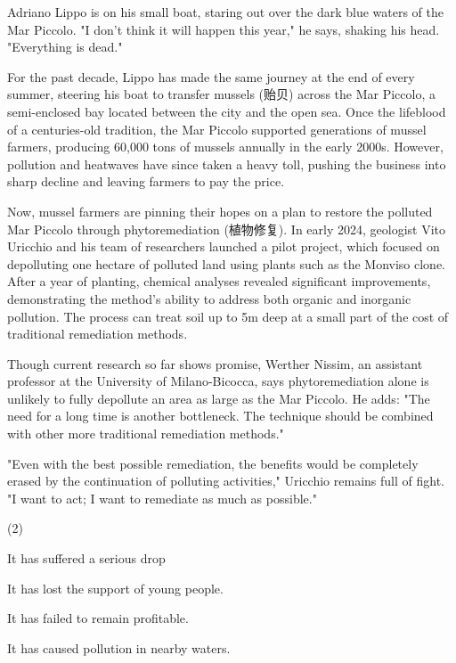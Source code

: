\documentclass{英语试卷}
\begin{document}
\par Adriano Lippo is on his small boat, staring out over the dark blue waters of the Mar Piccolo. "I don't think it will happen this year," he says, shaking his head. "Everything is dead."\par
\par For the past decade, Lippo has made the same journey at the end of every summer, steering his boat to transfer mussels (贻贝) across the Mar Piccolo, a semi-enclosed bay located between the city and the open sea. Once the lifeblood of a centuries-old tradition, the Mar Piccolo supported generations of mussel farmers, producing 60,000 tons of mussels annually in the early 2000s. However, pollution and heatwaves have since taken a heavy toll, pushing the business into sharp decline and leaving farmers to pay the price.\par
\par Now, mussel farmers are pinning their hopes on a plan to restore the polluted Mar Piccolo through phytoremediation (植物修复). In early 2024, geologist Vito Uricchio and his team of researchers launched a pilot project, which focused on depolluting one hectare of polluted land using plants such as the Monviso clone. After a year of planting, chemical analyses revealed significant improvements, demonstrating the method's ability to address both organic and inorganic pollution. The process can treat soil up to 5m deep at a small part of the cost of traditional remediation methods.\par
\par Though current research so far shows promise, Werther Nissim, an assistant professor at the University of Milano-Bicocca, says phytoremediation alone is unlikely to fully depollute an area as large as the Mar Piccolo. He adds: "The need for a long time is another bottleneck. The technique should be combined with other more traditional remediation methods."\par
\par "Even with the best possible remediation, the benefits would be completely erased by the continuation of polluting activities," Uricchio remains full of fight. "I want to act; I want to remediate as much as possible."\par
{}
\begin{choices}(2)
  \item It has suffered a serious drop
  \item It has lost the support of young people.
  \item It has failed to remain profitable.
  \item It has caused pollution in nearby waters.
\end{choices}
\end{document}
